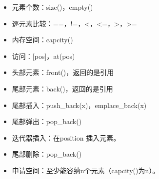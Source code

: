 \documentclass[letterpaper,10pt,english]{sphinxmanual}
\begin{document}
\begin{itemize}
\item {} 
元素个数：size()，empty()

\item {} 
逐元素比较：==，!=，\textless{}，\textless{}=，\textgreater{}，\textgreater{}=

\item {} 
内存空间：capcity()

\item {} 
访问：{[}pos{]}，at(pos)

\item {} 
头部元素：front()，返回的是引用

\item {} 
尾部元素：back()，返回的是引用

\item {} 
尾部插入：push\_back(x)，emplace\_back(x)

\item {} 
尾部弹出：pop\_back()

\item {} 
迭代器插入：在position  插入元素。

%
\begin{sphinxVerbatim}[commandchars=\\\{\}]
      

  
     
\end{sphinxVerbatim}

\item {} 
尾部删除：pop\_back()

\item {} 
申请空间：至少能容纳n个元素（capcity()为n）。

%
\begin{sphinxVerbatim}[commandchars=\\\{\}]
   
\end{sphinxVerbatim}


\end{itemize}
\end{document}
